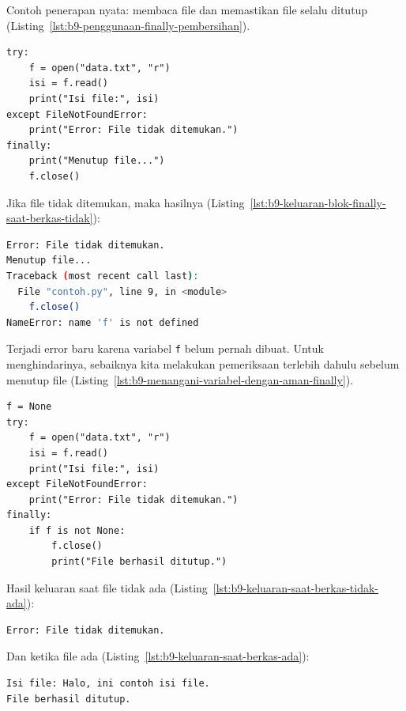 Contoh penerapan nyata: membaca file dan memastikan file selalu ditutup (Listing~\ref{lst:b9-penggunaan-finally-pembersihan}).

\begin{lstlisting}[style=PythonStyle, caption={Contoh penggunaan finally untuk pembersihan}, label={lst:b9-penggunaan-finally-pembersihan}]
try:
    f = open("data.txt", "r")
    isi = f.read()
    print("Isi file:", isi)
except FileNotFoundError:
    print("Error: File tidak ditemukan.")
finally:
    print("Menutup file...")
    f.close()
\end{lstlisting}

Jika file tidak ditemukan, maka hasilnya (Listing~\ref{lst:b9-keluaran-blok-finally-saat-berkas-tidak}):

\begin{lstlisting}[language=bash, caption={Keluaran blok finally saat berkas tidak ditemukan}, label={lst:b9-keluaran-blok-finally-saat-berkas-tidak}]
Error: File tidak ditemukan.
Menutup file...
Traceback (most recent call last):
  File "contoh.py", line 9, in <module>
    f.close()
NameError: name 'f' is not defined
\end{lstlisting}

Terjadi error baru karena variabel \texttt{f} belum pernah dibuat. Untuk menghindarinya, sebaiknya kita melakukan pemeriksaan terlebih dahulu sebelum menutup file (Listing~\ref{lst:b9-menangani-variabel-dengan-aman-finally}).

\begin{lstlisting}[style=PythonStyle, caption={Menangani variabel dengan aman di finally}, label={lst:b9-menangani-variabel-dengan-aman-finally}]
f = None
try:
    f = open("data.txt", "r")
    isi = f.read()
    print("Isi file:", isi)
except FileNotFoundError:
    print("Error: File tidak ditemukan.")
finally:
    if f is not None:
        f.close()
        print("File berhasil ditutup.")
\end{lstlisting}

Hasil keluaran saat file tidak ada (Listing~\ref{lst:b9-keluaran-saat-berkas-tidak-ada}):

\begin{lstlisting}[language=bash, caption={Keluaran saat berkas tidak ada}, label={lst:b9-keluaran-saat-berkas-tidak-ada}]
Error: File tidak ditemukan.
\end{lstlisting}

Dan ketika file ada (Listing~\ref{lst:b9-keluaran-saat-berkas-ada}):

\begin{lstlisting}[language=bash, caption={Keluaran saat berkas ada}, label={lst:b9-keluaran-saat-berkas-ada}]
Isi file: Halo, ini contoh isi file.
File berhasil ditutup.
\end{lstlisting}


